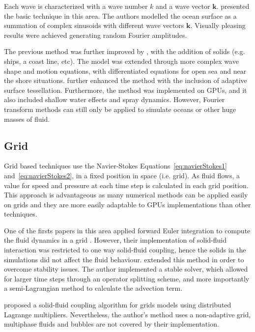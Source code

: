 Each wave is characterized with a wave number $k$ and a wave vector $\mathbf{k}$.
\cite{Tessendorf2001} presented the basic technique in this area.
The authors modelled the ocean surface as a summation of complex sinusoids with different wave vectors $\mathbf{k}$.
Visually pleasing results were achieved generating random Fourier amplitudes.

The previous method was further improved by \cite{Cieutat2003}, with the addition of solids (e.g. ships, a coast line, etc).
The model was extended through more complex wave shape and motion equations, with differentiated equations for open sea and near the shore situations.
\cite{Chiu2006} further enhanced the method with the inclusion of adaptive surface tessellation.
Furthermore, the method was implemented on GPUs, and it also included shallow water effects and spray dynamics.
However, Fourier transform methods can still only be applied to simulate oceans or other huge masses of fluid. 

\subsection{Grid}
\label{gridFluidSolvers}

Grid based techniques use the Navier-Stokes Equations~\ref{eq:navierStokes1} and~\ref{eq:navierStokes2}, in a fixed position in space (i.e. grid).
As fluid flows, a value for speed and pressure at each time step is calculated in each grid position.
This approach is advantageous as many numerical methods can be applied easily on grids and they are more easily adaptable to GPUs implementations than other techniques.

One of the firsts papers in this area applied forward Euler integration to compute the fluid dynamics in a grid \cite{Foster1996}.
However, their implementation of solid-fluid interaction was restricted to one way solid-fluid coupling, hence the solids in the simulations did not affect the fluid behaviour.
\cite{Stam1999} extended this method in order to overcome stability issues.
The author implemented a stable solver, which allowed for larger time steps through an operator splitting scheme, and more importantly a semi-Lagrangian method to calculate the advection term.

\cite{Carlson2004} proposed a solid-fluid coupling algorithm for grids models using distributed Lagrange multipliers.
Nevertheless, the author's method uses a non-adaptive grid, multiphase fluids and bubbles are not covered by their implementation.

